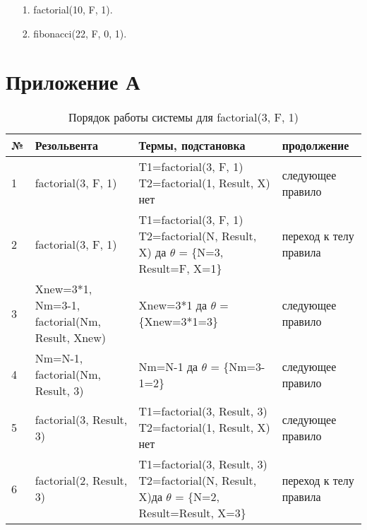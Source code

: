 \begin{enumerate}
	\item[1.] factorial(10, F, 1).
	\item[2.] fibonacci(22, F, 0, 1).
\end{enumerate}

\chapter*{Приложение А}

\begin{table}[!h]
	\begin{center}
		\begin{threeparttable}
			\captionsetup{justification=raggedright,singlelinecheck=off}
			\caption{Порядок работы системы для factorial(3, F, 1)}
			\begin{tabular}{|m{0.5cm}|m{3.5cm}|m{8.5cm}|m{3cm}|}
				\hline
				№ & Резольвента &Термы, подстановка & продолжение \\
				\hline
				1 & factorial(3, F, 1) & T1=factorial(3, F, 1) \newline T2=factorial(1, Result, X) нет & следующее правило \\
				\hline
				2 & factorial(3, F, 1) & T1=factorial(3, F, 1) \newline T2=factorial(N, Result, X) да \newline $\theta$ = \{N=3, Result=F, X=1\} & переход к \newline телу правила \\
				\hline
				3 & Xnew=3*1, \newline Nm=3-1, \newline factorial(Nm, Result, Xnew) & Xnew=3*1 да \newline $\theta$ = \{Xnew=3*1=3\} & следующее правило \\
				\hline
				4 & Nm=N-1, \newline factorial(Nm, Result, 3) & Nm=N-1 \newline да \newline $\theta$ = \{Nm=3-1=2\} & следующее правило \\
				\hline
				5 & factorial(3, Result, 3) & T1=factorial(3, Result, 3) \newline T2=factorial(1, Result, X) нет & следующее правило \\
				\hline
				6 & factorial(2, Result, 3) & T1=factorial(3, Result, 3) \newline T2=factorial(N, Result, X)\newline да \newline $\theta$ = \{N=2, Result=Result, X=3\} & переход к \newline телу правила \\

\end{tabular}
\end{threeparttable}
\end{center}
\end{table}
